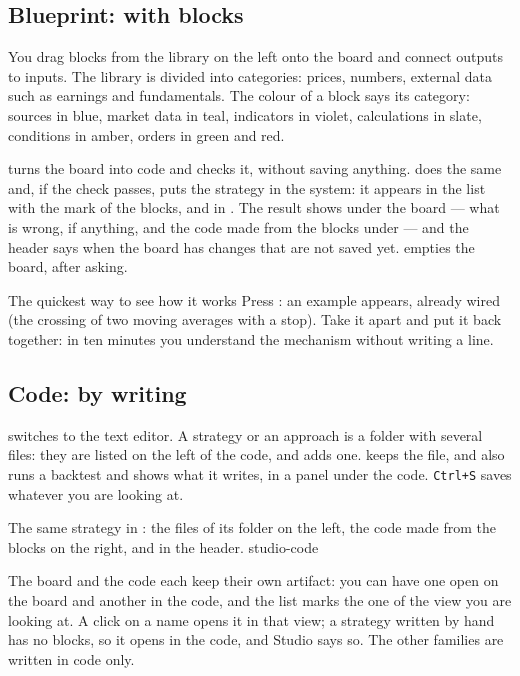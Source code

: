 \subsection{Blueprint: with blocks}

You drag blocks from the library on the left onto the board and connect
outputs to inputs. The library is divided into categories: prices, numbers,
external data such as earnings and fundamentals. The colour of a block says
its category: sources in blue, market data in teal, indicators in violet,
calculations in slate, conditions in amber, orders in green and red.

 turns the board into code and checks it, without saving
anything.  does the same and, if the check passes, puts the
strategy in the system: it appears in the list with the mark of the blocks,
and in . The result shows under the board --- what is
wrong, if anything, and the code made from the blocks under
 --- and the header says when the board has changes
that are not saved yet.  empties the board, after asking.

\begin{pratica}{The quickest way to see how it works}
Press : an example appears, already wired (the
crossing of two moving averages with a stop). Take it apart and put it back
together: in ten minutes you understand the mechanism without writing a
line.
\end{pratica}

\subsection{Code: by writing}

 switches to the text editor. A strategy or an approach is a
folder with several files: they are listed on the left of the code, and
 adds one.  keeps the file, and
 also runs a backtest and shows what it writes, in a
panel under the code. \texttt{Ctrl+S} saves whatever you are looking at.

  {The same strategy in : the files of its folder on the left,
   the code made from the blocks on the right,  and
    in the header.}
  {studio-code}

\noindent
The board and the code each keep their own artifact: you can have one open
on the board and another in the code, and the list marks the one of the
view you are looking at. A click on a name opens it in that view; a
strategy written by hand has no blocks, so it opens in the code, and Studio
says so. The other families are written in code only.


